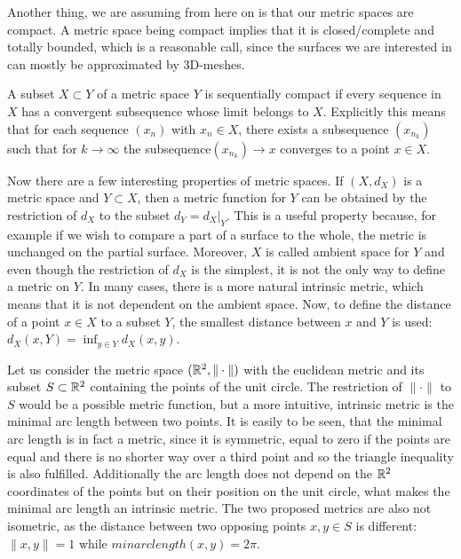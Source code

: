 Another thing, we are assuming from here on is that our metric spaces are compact.
A metric space being compact implies that it is closed/complete and totally bounded, which is a reasonable call, since the surfaces we are interested in can mostly be approximated by 3D-meshes.
\begin{mydef}
	A subset $X \subset Y$ of a metric space $Y$ is sequentially compact if every sequence in $X$ has a convergent subsequence whose limit belongs to $X$.
	Explicitly this means that for each sequence $(x_n)$ with $x_n \in X$, there exists a subsequence $(x_{n_k})$ such that for $k \rightarrow \infty$ the subsequence$(x_{n_k}) \rightarrow x$ converges to a point $x\in X$.
\end{mydef}

Now there are a few interesting properties of metric spaces.
If $(X,d_X)$ is a metric space and $Y \subset X$, then a metric function for $Y$ can be obtained by the restriction of $d_X$ to the subset $d_Y = \left.d_X\right|_Y$.
This is a useful property because, for example if we wish to compare a part of a surface to the whole, the metric is unchanged on the partial surface.
Moreover, $X$ is called ambient space for $Y$ and even though the restriction of $d_X$ is the simplest, it is not the only way to define a metric on $Y$.
In many cases, there is a more natural intrinsic metric, which means that it is not dependent on the ambient space.
Now, to define the distance of a point $x \in X$ to a subset $Y$, the smallest distance between $x$ and $Y$ is used: $d_X(x,Y) = \inf_{y \in Y} d_X(x,y)$.

\begin{example}
Let us consider the metric space $(\mathbb{R}^2, \|\cdot\|)$ with the euclidean metric and its subset $S \subset \mathbb{R}^2$ containing the points of the unit circle.
The restriction of $\|\cdot\|$ to $S$ would be a possible metric function, but a more intuitive, intrinsic metric is the minimal arc length between two points.
It is easily to be seen, that the minimal arc length is in fact a metric, since it is symmetric, equal to zero if the points are equal and there is no shorter way over a third point and so the triangle inequality is also fulfilled.
Additionally the arc length does not depend on the $\mathbb{R}^2$ coordinates of the points but on their position on the unit circle, what makes the minimal arc length an intrinsic metric.
The two proposed metrics are also not isometric, as the distance between two opposing points $x,y\in S$ is different: $\|x,y\| = 1$ while $minarclength(x,y) = 2\pi$.
\end{example}

